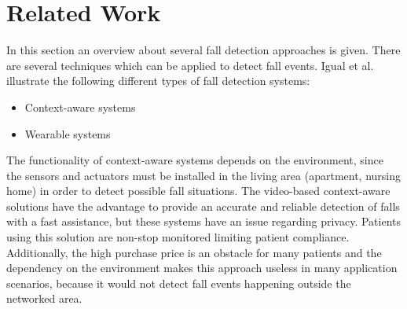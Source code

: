 \documentclass[10pt,journal,compsoc]{IEEEtran}
\begin{document}
\section{Related Work}
\label{sec:relatedwork}
In this section an overview about several fall detection approaches is given. There are several techniques which can be applied to detect fall events. Igual et al. \cite{Igual2013} illustrate the following different types of fall detection systems:
\begin{itemize}
	\item Context-aware systems
	\item Wearable systems
\end{itemize}
The functionality of context-aware systems depends on the environment, since the sensors and actuators must be installed in the living area (apartment, nursing home) in order to detect possible fall situations. The video-based context-aware solutions have the advantage to provide an accurate and reliable detection of falls with a fast assistance, but these systems have an issue regarding privacy. Patients using this solution are non-stop monitored limiting patient compliance. Additionally, the high purchase price is an obstacle for many patients and the dependency on the environment makes this approach useless in many application scenarios, because it would not detect fall events happening outside the networked area.
\end{document}

